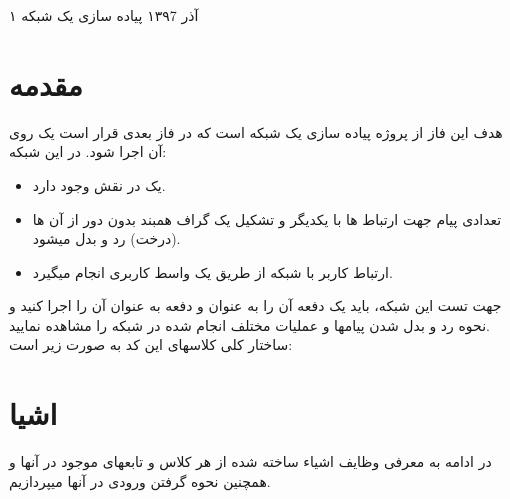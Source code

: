 \documentclass{article}
\begin{document}
    \handout
    {}
    {۱}
    {آذر ۱۳۹7}
    {پیاده سازی یک شبکه     }
    
    \vspace{0.3cm}
    \section{مقدمه}
هدف این فاز از پروژه پیاده سازی یک شبکه    است که در فاز بعدی قرار است یک   روی آن اجرا شود. در این شبکه:
    \begin{itemize}
\item	یک   در نقش   وجود دارد.
\item	 تعدادی پیام جهت ارتباط   ها با یکدیگر و تشکیل یک گراف همبند بدون دور از آن ها (درخت) رد و بدل میشود. 
\item	ارتباط کاربر با شبکه از طریق یک واسط کاربری انجام میگیرد.
    \end{itemize}
جهت تست این شبکه، باید یک دفعه آن را به عنوان    و  دفعه به عنوان  آن را اجرا کنید و نحوه رد و بدل شدن پیامها و عملیات مختلف انجام شده در شبکه را مشاهده نمایید.\\
ساختار کلی کلاسهای این کد به صورت زیر است:


    \section{اشیا}
در ادامه به معرفی وظایف اشیاء ساخته شده از هر کلاس و تابعهای موجود در آنها و همچنین نحوه گرفتن ورودی در آنها میپردازیم.
\end{document}
